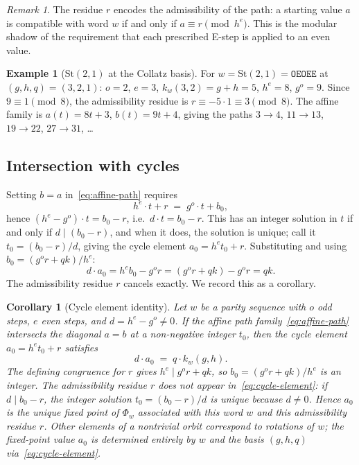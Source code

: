 \documentclass[12pt]{article}
\newtheorem{corollary}[theorem]{Corollary}
\theoremstyle{definition}
\newtheorem{example}[theorem]{Example}
\theoremstyle{remark}
\newtheorem{remark}[theorem]{Remark}
\newcommand{\St}{\mathrm{St}}
\newcommand{\kpoly}{k}
\begin{document}
\begin{remark}
The residue $r$ encodes the admissibility of the path: a starting value
$a$ is compatible with word $w$ if and only if $a \equiv r \pmod{h^e}$.
This is the modular shadow of the requirement that each prescribed E-step
is applied to an even value.
\end{remark}

\begin{example}[$\St(2,1)$ at the Collatz basis]
For $w = \St(2,1) = \texttt{OEOEE}$ at $(g,h,q) = (3,2,1)$: $o=2$, $e=3$,
$\kpoly_w(3,2) = g + h = 5$, $h^e = 8$, $g^o = 9$.  Since $9 \equiv 1
\pmod{8}$, the admissibility residue is $r \equiv -5 \cdot 1 \equiv 3
\pmod{8}$.  The affine family is $a(t) = 8t + 3$, $b(t) = 9t + 4$,
giving the paths $3 \to 4$, $11 \to 13$, $19 \to 22$, $27 \to 31$, \ldots
\end{example}

\subsection{Intersection with cycles}

Setting $b = a$ in~\eqref{eq:affine-path} requires
\[
  h^e \cdot t + r \;=\; g^o \cdot t + b_0,
\]
hence $(h^e - g^o) \cdot t = b_0 - r$, i.e.\ $d \cdot t = b_0 - r$.
This has an integer solution in $t$ if and only if $d \mid (b_0 - r)$,
and when it does, the solution is unique; call it $t_0 = (b_0 - r)/d$,
giving the cycle element $a_0 = h^e t_0 + r$.  Substituting and using
$b_0 = (g^o r + q k)/h^e$:
\[
  d \cdot a_0 = h^e b_0 - g^o r
              = (g^o r + qk) - g^o r
              = qk.
\]
The admissibility residue $r$ cancels exactly.  We record this as a corollary.

\begin{corollary}[Cycle element identity]
\label{cor:cycle-element}
Let $w$ be a parity sequence with $o$ odd steps, $e$ even steps, and
$d = h^e - g^o \neq 0$.  If the affine path family~\eqref{eq:affine-path}
intersects the diagonal $a = b$ at a non-negative integer $t_0$, then the
cycle element $a_0 = h^e t_0 + r$ satisfies
\begin{equation}
  \label{eq:cycle-element}
  d \cdot a_0 \;=\; q \cdot \kpoly_w(g,h).
\end{equation}
The defining congruence for $r$ gives $h^e \mid g^o r + qk$, so $b_0 =
(g^o r + qk)/h^e$ is an integer.  The admissibility residue $r$ does not
appear in~\eqref{eq:cycle-element}: if $d \mid b_0 - r$, the integer
solution $t_0 = (b_0 - r)/d$ is unique because $d \neq 0$.  Hence $a_0$
is the unique fixed point of $\Phi_w$ associated with this word $w$ and
this admissibility residue $r$.  Other elements of a nontrivial orbit correspond to
rotations of $w$; the fixed-point value $a_0$ is determined entirely by
$w$ and the basis $(g,h,q)$ via~\eqref{eq:cycle-element}.
\end{corollary}
\end{document}
